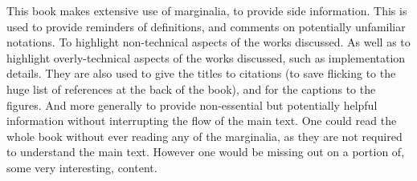 \documentclass[12pt,parskip]{komatufte}
\begin{document}
This book makes extensive use of marginalia, to provide side information.
This is used to provide reminders of definitions, and comments on potentially unfamiliar notations.
To highlight non-technical aspects of the works discussed.
As well as to highlight overly-technical aspects of the works discussed, such as implementation details.
They are also used to give the titles to citations (to save flicking to the huge list of references at the back of the book), and for the captions to the figures.
And more generally to provide non-essential  but potentially helpful information without interrupting the flow of the main text.
One could read the whole book without ever reading any of the marginalia, as they are not required to understand the main text.
However one would be missing out on a portion of, some very interesting, content.
\end{document}
